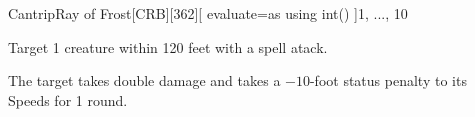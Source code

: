 
\begin{card-collection}{Cantrip}{\level}{Ray of Frost}[CRB][362]{\level}[
  evaluate=\level as \bonus using int()
]{1, ..., 10}




Target 1 creature within 120 feet with a spell atack.


 The target takes double damage
and takes a \(-10\)-foot status penalty to its Speeds for 1 round.

\end{card-collection}%